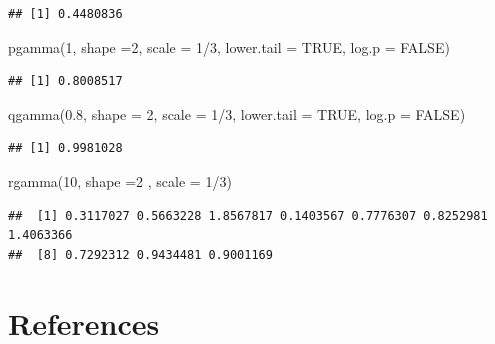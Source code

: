 \documentclass[
]{book}
\newenvironment{Shaded}{\begin{snugshade}}{\end{snugshade}}
\newcommand{\AttributeTok}[1]{\textcolor[rgb]{0.77,0.63,0.00}{#1}}
\newcommand{\ConstantTok}[1]{\textcolor[rgb]{0.00,0.00,0.00}{#1}}
\newcommand{\DecValTok}[1]{\textcolor[rgb]{0.00,0.00,0.81}{#1}}
\newcommand{\FloatTok}[1]{\textcolor[rgb]{0.00,0.00,0.81}{#1}}
\newcommand{\FunctionTok}[1]{\textcolor[rgb]{0.00,0.00,0.00}{#1}}
\newcommand{\NormalTok}[1]{#1}
\newcommand{\SpecialCharTok}[1]{\textcolor[rgb]{0.00,0.00,0.00}{#1}}
\begin{document}
\begin{verbatim}
## [1] 0.4480836
\end{verbatim}

\begin{Shaded}
\begin{Highlighting}[]
\FunctionTok{pgamma}\NormalTok{(}\DecValTok{1}\NormalTok{, }\AttributeTok{shape =}\DecValTok{2}\NormalTok{, }\AttributeTok{scale =} \DecValTok{1}\SpecialCharTok{/}\DecValTok{3}\NormalTok{, }\AttributeTok{lower.tail =} \ConstantTok{TRUE}\NormalTok{,}
       \AttributeTok{log.p =} \ConstantTok{FALSE}\NormalTok{)}
\end{Highlighting}
\end{Shaded}

\begin{verbatim}
## [1] 0.8008517
\end{verbatim}

\begin{Shaded}
\begin{Highlighting}[]
\FunctionTok{qgamma}\NormalTok{(}\FloatTok{0.8}\NormalTok{, }\AttributeTok{shape =} \DecValTok{2}\NormalTok{,  }\AttributeTok{scale =} \DecValTok{1}\SpecialCharTok{/}\DecValTok{3}\NormalTok{, }\AttributeTok{lower.tail =} \ConstantTok{TRUE}\NormalTok{,}
       \AttributeTok{log.p =} \ConstantTok{FALSE}\NormalTok{)}
\end{Highlighting}
\end{Shaded}

\begin{verbatim}
## [1] 0.9981028
\end{verbatim}

\begin{Shaded}
\begin{Highlighting}[]
\FunctionTok{rgamma}\NormalTok{(}\DecValTok{10}\NormalTok{, }\AttributeTok{shape =}\DecValTok{2}\NormalTok{ , }\AttributeTok{scale =} \DecValTok{1}\SpecialCharTok{/}\DecValTok{3}\NormalTok{)}
\end{Highlighting}
\end{Shaded}

\begin{verbatim}
##  [1] 0.3117027 0.5663228 1.8567817 0.1403567 0.7776307 0.8252981 1.4063366
##  [8] 0.7292312 0.9434481 0.9001169
\end{verbatim}

\newpage

\hypertarget{references}{%
\section{References}\label{references}}
\end{document}

